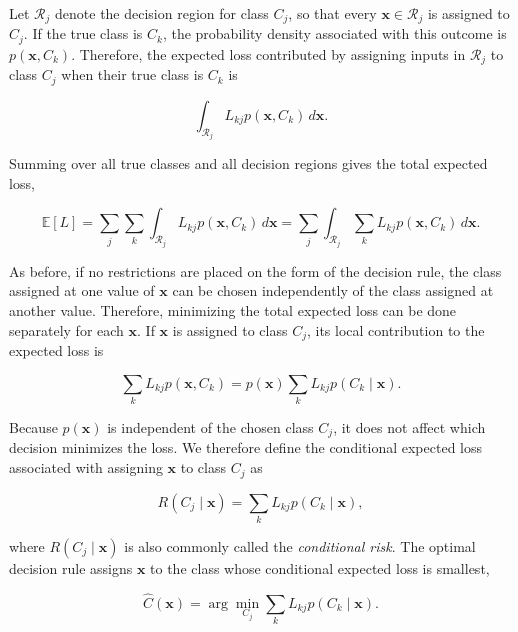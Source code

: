 \documentclass[10pt,twocolumn]{memoir}
\begin{document}
Let $\mathcal{R}_j$ denote the decision region for class $C_j$, so that every $\mathbf{x}\in\mathcal{R}_j$ is assigned to $C_j$. If the true class is $C_k$, the probability density associated with this outcome is $p(\mathbf{x},C_k)$. Therefore, the expected loss contributed by assigning inputs in $\mathcal{R}_j$ to class $C_j$ when their true class is $C_k$ is

\begin{equation}
    \int_{\mathcal{R}_j}L_{kj}p(\mathbf{x},C_k)\,d\mathbf{x}.
\end{equation}

Summing over all true classes and all decision regions gives the total expected loss,

\begin{equation}
    \mathbb{E}[L] = \sum_{j}\sum_{k}\int_{\mathcal{R}_j}L_{kj}p(\mathbf{x},C_k)\,d\mathbf{x} = \sum_{j}\int_{\mathcal{R}_j}\sum_{k}L_{kj}p(\mathbf{x},C_k)\,d\mathbf{x} .
\end{equation}

As before, if no restrictions are placed on the form of the decision rule, the class assigned at one value of $\mathbf{x}$ can be chosen independently of the class assigned at another value. Therefore, minimizing the total expected loss can be done separately for each $\mathbf{x}$. If $\mathbf{x}$ is assigned to class $C_j$, its local contribution to the expected loss is

\begin{equation}
    \sum_{k}L_{kj}p(\mathbf{x},C_k) = p(\mathbf{x})\sum_{k}L_{kj}p(C_k\mid\mathbf{x}).
\end{equation}

Because $p(\mathbf{x})$ is independent of the chosen class $C_j$, it does not affect which decision minimizes the loss. We therefore define the conditional expected loss associated with assigning $\mathbf{x}$ to class $C_j$ as

\begin{equation}
    R(C_j\mid\mathbf{x}) = \sum_{k}L_{kj}p(C_k\mid\mathbf{x}),
\end{equation}

where $R(C_j\mid\mathbf{x})$ is also commonly called the \textit{conditional risk}. The optimal decision rule assigns $\mathbf{x}$ to the class whose conditional expected loss is smallest,

\begin{equation}
    \hat{C}(\mathbf{x}) = \arg\min_{C_j}\sum_{k}L_{kj}p(C_k\mid\mathbf{x}).
\label{eq:c1_minimum_expected_loss_classification_rule}
\end{equation}
\end{document}
